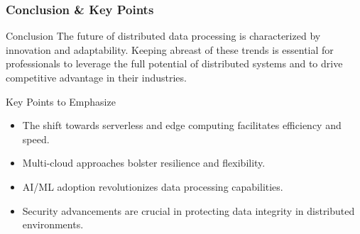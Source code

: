 \documentclass[aspectratio=169]{beamer}
\begin{document}
\begin{frame}[fragile]
  \frametitle{Conclusion & Key Points}
  \begin{block}{Conclusion}
    The future of distributed data processing is characterized by innovation and adaptability. Keeping abreast of these trends is essential for professionals to leverage the full potential of distributed systems and to drive competitive advantage in their industries.
  \end{block}

  \begin{block}{Key Points to Emphasize}
    \begin{itemize}
      \item The shift towards serverless and edge computing facilitates efficiency and speed.
      \item Multi-cloud approaches bolster resilience and flexibility.
      \item AI/ML adoption revolutionizes data processing capabilities.
      \item Security advancements are crucial in protecting data integrity in distributed environments.
    \end{itemize}
  \end{block}
\end{frame}
\end{document}
